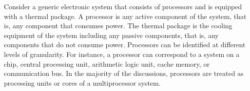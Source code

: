 Consider a generic electronic system that consists of \np processors and is
equipped with a thermal package. A processor is any active component of the
system, that is, any component that consumes power. The thermal package is the
cooling equipment of the system including any passive components, that is, any
components that do not consume power. Processors can be identified at different
levels of granularity. For instance, a processor can correspond to a system on a
chip, central processing unit, arithmetic logic unit, cache memory, or
communication bus. In the majority of the discussions, processors are treated as
processing units or cores of a multiprocessor system.
